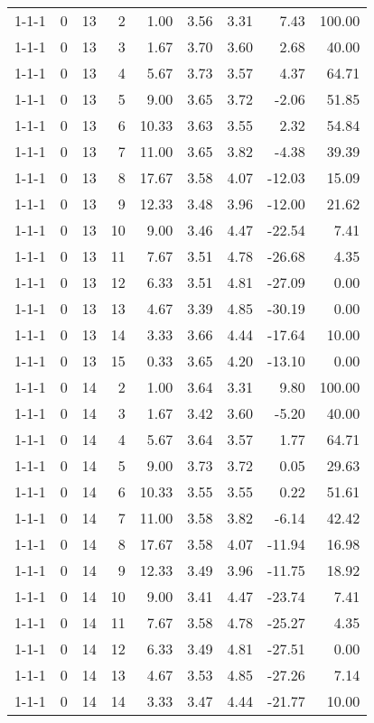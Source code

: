 \begin{tabular}{lrrrrrrrr}
1-1-1 & 0 & 13 & 2 & 1.00 & 3.56 & 3.31 & 7.43 & 100.00 \\
1-1-1 & 0 & 13 & 3 & 1.67 & 3.70 & 3.60 & 2.68 & 40.00 \\
1-1-1 & 0 & 13 & 4 & 5.67 & 3.73 & 3.57 & 4.37 & 64.71 \\
1-1-1 & 0 & 13 & 5 & 9.00 & 3.65 & 3.72 & -2.06 & 51.85 \\
1-1-1 & 0 & 13 & 6 & 10.33 & 3.63 & 3.55 & 2.32 & 54.84 \\
1-1-1 & 0 & 13 & 7 & 11.00 & 3.65 & 3.82 & -4.38 & 39.39 \\
1-1-1 & 0 & 13 & 8 & 17.67 & 3.58 & 4.07 & -12.03 & 15.09 \\
1-1-1 & 0 & 13 & 9 & 12.33 & 3.48 & 3.96 & -12.00 & 21.62 \\
1-1-1 & 0 & 13 & 10 & 9.00 & 3.46 & 4.47 & -22.54 & 7.41 \\
1-1-1 & 0 & 13 & 11 & 7.67 & 3.51 & 4.78 & -26.68 & 4.35 \\
1-1-1 & 0 & 13 & 12 & 6.33 & 3.51 & 4.81 & -27.09 & 0.00 \\
1-1-1 & 0 & 13 & 13 & 4.67 & 3.39 & 4.85 & -30.19 & 0.00 \\
1-1-1 & 0 & 13 & 14 & 3.33 & 3.66 & 4.44 & -17.64 & 10.00 \\
1-1-1 & 0 & 13 & 15 & 0.33 & 3.65 & 4.20 & -13.10 & 0.00 \\
1-1-1 & 0 & 14 & 2 & 1.00 & 3.64 & 3.31 & 9.80 & 100.00 \\
1-1-1 & 0 & 14 & 3 & 1.67 & 3.42 & 3.60 & -5.20 & 40.00 \\
1-1-1 & 0 & 14 & 4 & 5.67 & 3.64 & 3.57 & 1.77 & 64.71 \\
1-1-1 & 0 & 14 & 5 & 9.00 & 3.73 & 3.72 & 0.05 & 29.63 \\
1-1-1 & 0 & 14 & 6 & 10.33 & 3.55 & 3.55 & 0.22 & 51.61 \\
1-1-1 & 0 & 14 & 7 & 11.00 & 3.58 & 3.82 & -6.14 & 42.42 \\
1-1-1 & 0 & 14 & 8 & 17.67 & 3.58 & 4.07 & -11.94 & 16.98 \\
1-1-1 & 0 & 14 & 9 & 12.33 & 3.49 & 3.96 & -11.75 & 18.92 \\
1-1-1 & 0 & 14 & 10 & 9.00 & 3.41 & 4.47 & -23.74 & 7.41 \\
1-1-1 & 0 & 14 & 11 & 7.67 & 3.58 & 4.78 & -25.27 & 4.35 \\
1-1-1 & 0 & 14 & 12 & 6.33 & 3.49 & 4.81 & -27.51 & 0.00 \\
1-1-1 & 0 & 14 & 13 & 4.67 & 3.53 & 4.85 & -27.26 & 7.14 \\
1-1-1 & 0 & 14 & 14 & 3.33 & 3.47 & 4.44 & -21.77 & 10.00 \\

\end{tabular}
